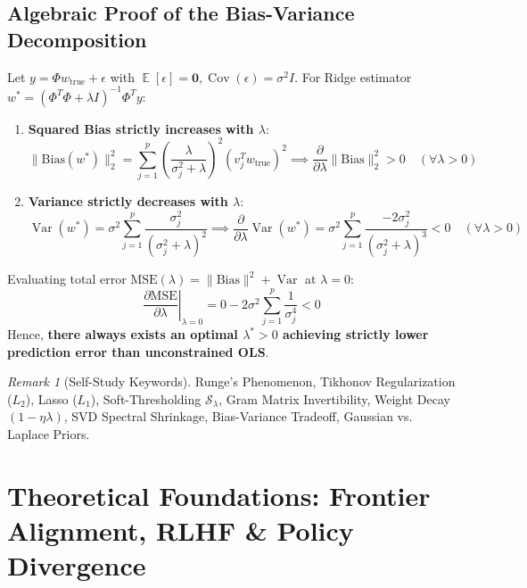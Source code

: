 \documentclass[11pt,a4paper]{article}
\theoremstyle{definition}
\theoremstyle{plain}
\theoremstyle{remark}
\newtheorem*{remark}{Remark}
\DeclareMathOperator{\E}{\mathbb{E}}
\DeclareMathOperator{\Var}{Var}
\DeclareMathOperator{\Cov}{Cov}
\begin{document}
\subsection{Algebraic Proof of the Bias-Variance Decomposition}
Let $y = \Phi w_{\mathrm{true}} + \epsilon$ with $\E[\epsilon] = \mathbf{0}, \Cov(\epsilon) = \sigma^2 I$.
For Ridge estimator $w^* = (\Phi^T \Phi + \lambda I)^{-1}\Phi^T y$:
\begin{enumerate}
    \item \textbf{Squared Bias strictly increases with $\lambda$}:
    \begin{equation}
    \|\mathrm{Bias}(w^*)\|_2^2 = \sum_{j=1}^p \left( \frac{\lambda}{\sigma_j^2 + \lambda} \right)^2 (v_j^T w_{\mathrm{true}})^2 \implies \frac{\partial}{\partial \lambda} \|\mathrm{Bias}\|_2^2 > 0 \quad (\forall \lambda > 0)
    \end{equation}
    \item \textbf{Variance strictly decreases with $\lambda$}:
    \begin{equation}
    \Var(w^*) = \sigma^2 \sum_{j=1}^p \frac{\sigma_j^2}{(\sigma_j^2 + \lambda)^2} \implies \frac{\partial}{\partial \lambda} \Var(w^*) = \sigma^2 \sum_{j=1}^p \frac{-2\sigma_j^2}{(\sigma_j^2 + \lambda)^3} < 0 \quad (\forall \lambda > 0)
    \end{equation}
\end{enumerate}
Evaluating total error $\mathrm{MSE}(\lambda) = \|\mathrm{Bias}\|^2 + \Var$ at $\lambda = 0$:
\begin{equation}
\left. \frac{\partial \mathrm{MSE}}{\partial \lambda} \right|_{\lambda = 0} = 0 - 2\sigma^2 \sum_{j=1}^p \frac{1}{\sigma_j^4} < 0
\end{equation}
Hence, \textbf{there always exists an optimal $\lambda^* > 0$ achieving strictly lower prediction error than unconstrained OLS}.

\begin{remark}[Self-Study Keywords]
Runge's Phenomenon, Tikhonov Regularization ($L_2$), Lasso ($L_1$), Soft-Thresholding $\mathcal{S}_\lambda$, Gram Matrix Invertibility, Weight Decay $(1-\eta\lambda)$, SVD Spectral Shrinkage, Bias-Variance Tradeoff, Gaussian vs. Laplace Priors.
\end{remark}

\section{Theoretical Foundations: Frontier Alignment, RLHF \& Policy Divergence}
\end{document}

